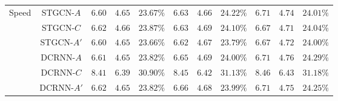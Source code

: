 \begin{table}[htb]
\begin{center}
{\begin{tabular}{c|c|ccc|ccc|ccc}
                \hline

                \multirow{6}{*}{Speed} & STGCN-$A$ & $6.60$ & $4.65$ & $23.67\%$ & $6.63$ & $4.66$ & $24.22\%$ & $6.71$ & $4.74$ & $24.01\%$\\
                ~ & STGCN-$C$ & $6.62$ & $4.66$ & $23.87\%$ & $6.63$ & $4.69$ & $24.10\%$ & $6.67$ & $\mathbf{4.71}$ & $24.04\%$\\ 
                ~ & STGCN-$A'$ & $\mathbf{6.60}$ & $\mathbf{4.65}$ & $\mathbf{23.66\%}$ & $\mathbf{6.62}$ & $\mathbf{4.67}$ & $\mathbf{23.79\%}$ & $\mathbf{6.67}$ & $4.72$ & $\mathbf{24.00\%}$\\
                ~ & DCRNN-$A$ & $6.61$ & $4.65$ & $23.82\%$ & $6.65$ & $4.69$ & $24.00\%$ & $6.71$ & $4.76$ & $24.29\%$\\
                ~ & DCRNN-$C$ & $8.41$ & $6.39$ & $30.90\%$ & $8.45$ & $6.42$ & $31.13\%$ & $8.46$ & $6.43$ & $31.18\%$\\
                ~ & DCRNN-$A'$ & $6.62$ & $4.65$ & $23.82\%$ & $6.66$ & $4.68$ & $23.99\%$ & $6.71$ & $4.75$ & $24.25\%$\\

                \bottomrule
            \end{tabular}
        }
    \end{center}
\end{table}

